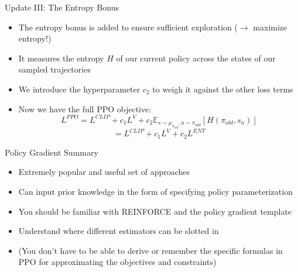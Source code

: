 \documentclass[aspectratio=169]{../latex_main/tntbeamer}  %
\begin{document}
\begin{frame}[c]{Update III: The Entropy Bonus}

	\begin{itemize}
	    \item The entropy bonus is added to ensure sufficient exploration ($\to$ maximize entropy!)
        \item It measures the entropy $H$ of our current policy across the states of our sampled trajectories
        \item We introduce the hyperparameter $c_2$ to weigh it against the other loss terms
        \item Now we have the full PPO objective:
        $$L^{PPO} = L^{CLIP} + c_1 L^V + c_2 \mathbb{E}_{s\sim \mu_{\pi_{old}}, a \sim \pi_{old}} \left[ H(\pi_{old}, s_n) \right] $$
        $$= L^{CLIP} + c_1 L^V + c_2 L^{ENT}$$
	\end{itemize}

\end{frame}
\begin{frame}[c]{Policy Gradient Summary}

\begin{itemize}
    \item Extremely popular and useful set of approaches
    \item Can input prior knowledge in the form of specifying policy parameterization
    \item You should be familiar with REINFORCE and the policy gradient template
    \item Understand where different estimators can be slotted in 
    \item (You don't have to be able to derive or remember the specific formulas in PPO for approximating the objectives and constraints)
\end{itemize}

\end{frame}
\end{document}
